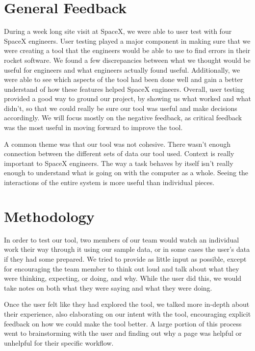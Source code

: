 \documentclass{hmcclinic}
\begin{document}
\section{General Feedback} %
During a week long site visit at SpaceX, we were able to user test with four SpaceX engineers. 
User testing played a major component in making sure that we were creating a
tool that the engineers would be able to use to find errors in their rocket
software. We found a few discrepancies between what we thought would be useful
for engineers and what engineers actually found useful. Additionally, we were
able to see which aspects of the tool had been done well and gain a better
understand of how these features helped SpaceX engineers. Overall, user testing
provided a good way to ground our project, by showing us what worked and what
didn't, so that we could really be sure our tool was useful and make decisions
accordingly. We will focus mostly on the negative feedback, as critical feedback
was the most useful in moving forward to improve the tool.

A common theme was that our tool was not cohesive. There wasn't enough
connection between the different sets of data our tool used. Context is really
important to SpaceX engineers. The way a task behaves by itself isn't really
enough to understand what is going on with the computer as a whole. Seeing the
interactions of the entire system is more useful than individual pieces.

\section{Methodology} %
In order to test our tool, two members of our team would watch an individual
work their way through it using our sample data, or in some cases the user's
data if they had some prepared. We tried to provide as little
input as possible, except for encouraging the team member to think out loud and
talk about what they were thinking, expecting, or doing, and why. While the user
did this, we would take notes on both what they were saying and what they were
doing.

Once the user felt like they had explored the tool, we talked more in-depth
about their experience, also elaborating on our intent with the tool,
encouraging explicit feedback on how we could make the tool better. A large
portion of this process went to brainstorming with the user and finding out why
a page was helpful or unhelpful for their specific workflow.
\end{document}
